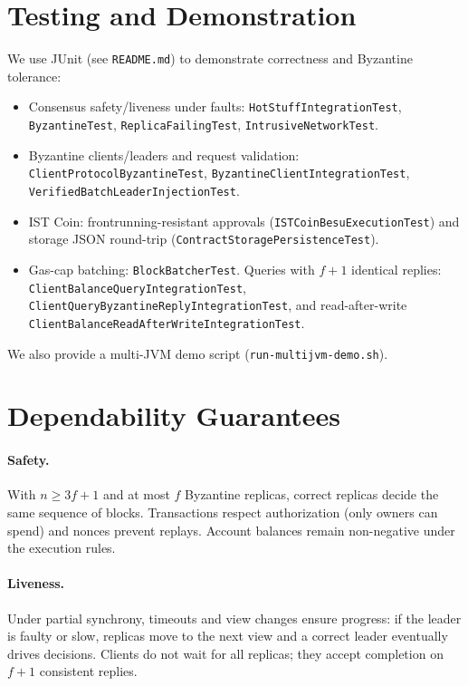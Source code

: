 \documentclass[runningheads]{llncs}
\begin{document}
\section{Testing and Demonstration}
We use JUnit (see \texttt{README.md}) to demonstrate correctness and Byzantine tolerance:
\begin{itemize}
  \item Consensus safety/liveness under faults: \texttt{HotStuffIntegrationTest}, \texttt{ByzantineTest}, \texttt{ReplicaFailingTest}, \texttt{IntrusiveNetworkTest}.
  \item Byzantine clients/leaders and request validation: \texttt{ClientProtocolByzantineTest}, \texttt{ByzantineClientIntegrationTest}, \texttt{VerifiedBatchLeaderInjectionTest}.
  \item IST Coin: frontrunning-resistant approvals (\texttt{ISTCoinBesuExecutionTest}) and storage JSON round-trip (\texttt{ContractStoragePersistenceTest}).
  \item Gas-cap batching: \texttt{BlockBatcherTest}. Queries with $f{+}1$ identical replies: \texttt{ClientBalanceQueryIntegrationTest}, \texttt{ClientQueryByzantineReplyIntegrationTest},
  and read-after-write \texttt{ClientBalanceReadAfterWriteIntegrationTest}.
\end{itemize}
We also provide a multi-JVM demo script (\texttt{run-multijvm-demo.sh}).

\section{Dependability Guarantees}
\paragraph{Safety.}
With $n \ge 3f+1$ and at most $f$ Byzantine replicas, correct replicas decide the same sequence of blocks.
Transactions respect authorization (only owners can spend) and nonces prevent replays.
Account balances remain non-negative under the execution rules.

\paragraph{Liveness.}
Under partial synchrony, timeouts and view changes ensure progress: if the leader is faulty or slow, replicas move to the next view and a correct leader
eventually drives decisions.
Clients do not wait for all replicas; they accept completion on $f{+}1$ consistent replies.
\end{document}
